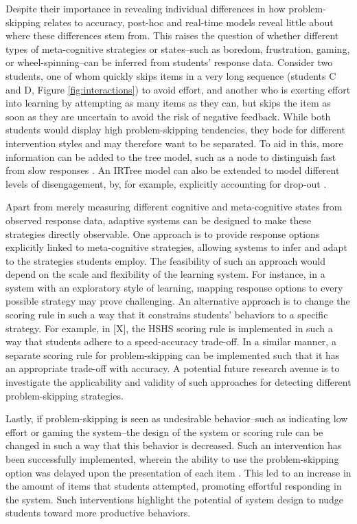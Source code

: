 \documentclass[12pt]{article}
\begin{document}
Despite their importance in revealing individual differences in how problem-skipping relates to accuracy, post-hoc and real-time models reveal little about where these differences stem from. This raises the question of whether different types of meta-cognitive strategies or states--such as boredom, frustration, gaming, or wheel-spinning--can be inferred from students' response data. Consider two students, one of whom quickly skips items in a very long sequence (students C and D, Figure \ref{fig:interactions}) to avoid effort, and another who is exerting effort into learning by attempting as many items as they can, but skips the item as soon as they are uncertain to avoid the risk of negative feedback. While both students would display high problem-skipping tendencies, they bode for different intervention styles and may therefore want to be separated. To aid in this, more information can be added to the tree model, such as a node to distinguish fast from slow responses \parencite{coomans2016distinguishing, hofman2018fast}. An IRTree model can also be extended to model different levels of disengagement, by, for example, explicitly accounting for drop-out \parencite{huang2020mixture}. 

Apart from merely measuring different cognitive and meta-cognitive states from observed response data, adaptive systems can be designed to make these strategies directly observable. One approach is to provide response options explicitly linked to meta-cognitive strategies, allowing systems to infer and adapt to the strategies students employ. The feasibility of such an approach would depend on the scale and flexibility of the learning system. For instance, in a system with an exploratory style of learning, mapping response options to every possible strategy may prove challenging. An alternative approach is to change the scoring rule in such a way that it constrains students' behaviors to a specific strategy. For example, in [X], the HSHS scoring rule \parencite{maris2012speed} is implemented in such a way that students adhere to a speed-accuracy trade-off. In a similar manner, a separate scoring rule for problem-skipping can be implemented such that it has an appropriate trade-off with accuracy. A potential future research avenue is to investigate the applicability and validity of such approaches for detecting different problem-skipping strategies. 

Lastly, if problem-skipping is seen as undesirable behavior--such as indicating low effort or gaming the system--the design of the system or scoring rule can be changed in such a way that this behavior is decreased. Such an intervention has been successfully implemented, wherein the ability to use the problem-skipping option was delayed upon the presentation of each item \parencite{savi2018delaying}. This led to an increase in the amount of items that students attempted, promoting effortful responding in the system. Such interventions highlight the potential of system design to nudge students toward more productive behaviors.
\end{document}

